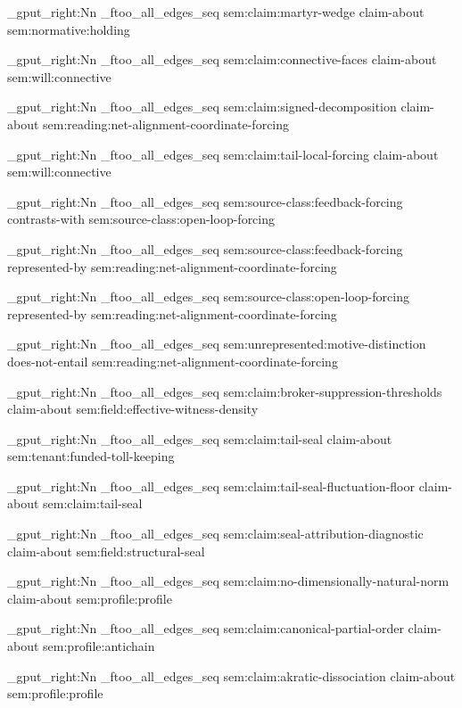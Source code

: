\seq_gput_right:Nn \g_ftoo_all_edges_seq { { sem:claim:martyr-wedge } { claim-about } { sem:normative:holding } }

\seq_gput_right:Nn \g_ftoo_all_edges_seq { { sem:claim:connective-faces } { claim-about } { sem:will:connective } }

\seq_gput_right:Nn \g_ftoo_all_edges_seq { { sem:claim:signed-decomposition } { claim-about } { sem:reading:net-alignment-coordinate-forcing } }

\seq_gput_right:Nn \g_ftoo_all_edges_seq { { sem:claim:tail-local-forcing } { claim-about } { sem:will:connective } }

\seq_gput_right:Nn \g_ftoo_all_edges_seq { { sem:source-class:feedback-forcing } { contrasts-with } { sem:source-class:open-loop-forcing } }

\seq_gput_right:Nn \g_ftoo_all_edges_seq { { sem:source-class:feedback-forcing } { represented-by } { sem:reading:net-alignment-coordinate-forcing } }

\seq_gput_right:Nn \g_ftoo_all_edges_seq { { sem:source-class:open-loop-forcing } { represented-by } { sem:reading:net-alignment-coordinate-forcing } }

\seq_gput_right:Nn \g_ftoo_all_edges_seq { { sem:unrepresented:motive-distinction } { does-not-entail } { sem:reading:net-alignment-coordinate-forcing } }

\seq_gput_right:Nn \g_ftoo_all_edges_seq { { sem:claim:broker-suppression-thresholds } { claim-about } { sem:field:effective-witness-density } }

\seq_gput_right:Nn \g_ftoo_all_edges_seq { { sem:claim:tail-seal } { claim-about } { sem:tenant:funded-toll-keeping } }

\seq_gput_right:Nn \g_ftoo_all_edges_seq { { sem:claim:tail-seal-fluctuation-floor } { claim-about } { sem:claim:tail-seal } }

\seq_gput_right:Nn \g_ftoo_all_edges_seq { { sem:claim:seal-attribution-diagnostic } { claim-about } { sem:field:structural-seal } }

\seq_gput_right:Nn \g_ftoo_all_edges_seq { { sem:claim:no-dimensionally-natural-norm } { claim-about } { sem:profile:profile } }

\seq_gput_right:Nn \g_ftoo_all_edges_seq { { sem:claim:canonical-partial-order } { claim-about } { sem:profile:antichain } }

\seq_gput_right:Nn \g_ftoo_all_edges_seq { { sem:claim:akratic-dissociation } { claim-about } { sem:profile:profile } }

